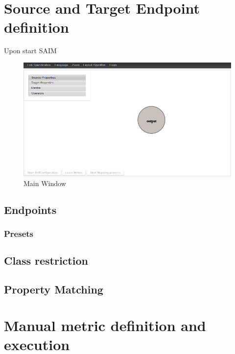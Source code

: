 \documentclass[oneside,a4paper,12pt]{memoir}
\begin{document}
\chapter{Source and Target Endpoint definition}
\label{kbdefinition}
	Upon start SAIM 
	\begin{figure}
		\centering
		\includegraphics[width=\textwidth]{images/main.png}
		\caption{Main Window}
		\label{fig:MainWindow}
	\end{figure}
	

	\section{Endpoints}
	\label{endpoint}
	 \subsection{Presets}
	\section{Class restriction}
	\label{classes}
	\section{Property Matching}
	\label{properties}
\chapter{Manual metric definition and execution}
\label{manual}

\end{document}
